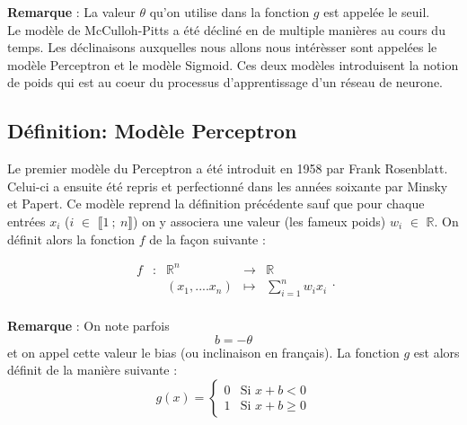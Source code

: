 \documentclass{article}
\newcommand{\fonction}[5]{
	\begin{array}{ccccc}
#1 & : & #2 & \to & #3\\
	& & #4 & \mapsto & #5\\ 
	\end{array}
}
\begin{document}
\textbf{Remarque} : La valeur $\theta$  qu'on utilise dans la fonction $g$ est appelée le seuil.\\
	

Le modèle de McCulloh-Pitts a été décliné en de multiple manières au cours du temps. Les déclinaisons auxquelles nous allons nous intérèsser sont appelées le modèle Perceptron et le modèle Sigmoid. Ces deux modèles introduisent la notion de poids qui est au coeur du processus d'apprentissage d'un réseau de neurone. 

\subsection{Définition: Modèle Perceptron}
		Le premier modèle du Perceptron a été introduit en 1958 par Frank Rosenblatt. Celui-ci a ensuite été repris et perfectionné dans les années soixante par Minsky et Papert. Ce modèle reprend la définition précédente sauf que pour chaque entrées $x_i$ ($i$ $\in$ $\llbracket 1~;~n \rrbracket$) on y associera une valeur (les fameux poids) $w_i$ $\in$ $\mathbb{R}$. 
		On définit alors la fonction $f$ de la façon suivante : 
		
		\[\fonction{f}{\mathbb{R}^n}{\mathbb{R}}{(x_1,....x_n)}{\sum_{i=1}^{n} {w_ix_i}}. \]

	
	\textbf{Remarque} : On note parfois \[b = -\theta \]  et on appel cette valeur le bias (ou inclinaison en français). La fonction $g$ est alors définit de la manière suivante :   
		\[g(x) = \begin{cases} 0 &\mbox{Si } x + b < 0 \\
				 1 & \mbox{Si } x + b \geq 0
	 		 \end{cases} \] \\
\vfill
\begin{center}
\end{center}
\vfill
	 
\end{document}
